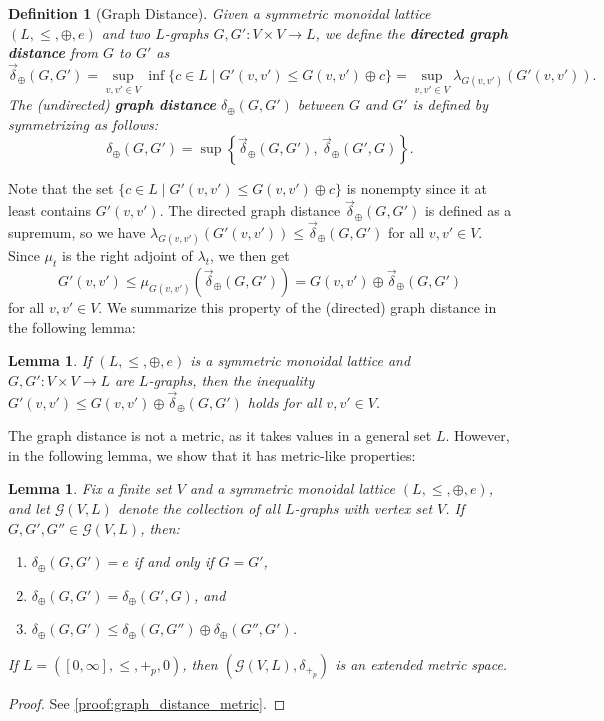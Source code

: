 \documentclass[a4paper,11pt]{article}
\newcommand{\atensor}{\oplus}
\newcounter{dummy}\numberwithin{dummy}{section}
\newtheorem{lemma}[dummy]{Lemma}
\newtheorem{definition}[dummy]{Definition}
\theoremstyle{remark}
\begin{document}
\begin{definition}[Graph Distance]
Given a symmetric monoidal lattice $(L,\leq,\atensor,e)$ and two $L$-graphs $G,G'\colon V\times V\to L$, we define the \textbf{directed graph distance} from $G$ to $G'$ as
\begin{equation*}
    \vec{\delta}_\atensor(G,G')=\sup_{v,v'\in V}\inf\{c\in L\mid G'(v,v')\leq G(v,v')\atensor c\}=\sup_{v,v'\in V}\lambda_{G(v,v')}\left(G'(v,v')\right).
\end{equation*}
The (undirected) \textbf{graph distance} $\delta_\atensor(G,G')$ between $G$ and $G'$ is defined by symmetrizing as follows:
\begin{equation*}
\delta_\atensor(G,G')=\sup\left\{\vec{\delta}_\atensor(G,G'),\,\vec{\delta}_\atensor(G',G)\right\}.
\end{equation*}
\end{definition}
Note that the set $\{c\in L\mid G'(v,v')\leq G(v,v')\atensor c\}$ is nonempty since it at least contains $G'(v,v')$. %
The directed graph distance $\vec{\delta}_\atensor(G,G')$ is defined as a supremum, so we have $\lambda_{G(v,v')}\left(G'(v,v')\right)\leq\vec{\delta}_\atensor(G,G')$ for all $v,v'\in V$. Since $\mu_t$ is the right adjoint of $\lambda_t$, we then get
\begin{equation*}
G'(v,v')\leq\mu_{G(v,v')}\left(\vec{\delta}_\atensor(G,G')\right)=G(v,v')\atensor\vec{\delta}_\atensor(G,G')
\end{equation*}
for all $v,v'\in V$. We summarize this property of the (directed) graph distance in the following lemma:
\begin{lemma}\label{lem:graph_distance_is_a_bound}
    If $(L,\leq,\atensor,e)$ is a symmetric monoidal lattice and $G,G'\colon V\times V\to L$ are $L$-graphs, then the inequality $G'(v,v')\leq G(v,v')\atensor\vec{\delta}_{\atensor}(G,G')$ holds for all $v,v'\in V$.
\end{lemma}

The graph distance is not a metric, as it takes values in a general set $L$. However, in the following lemma, we show that it has metric-like properties:
\begin{lemma}\label{lem:graph_distance_metric}
Fix a finite set $V$ and a symmetric monoidal lattice $(L,\leq,\atensor,e)$, and let $\mathcal{G}(V,L)$ denote the collection of all $L$-graphs with vertex set $V$. If $G,G',G''\in\mathcal{G}(V,L)$, then:
\begin{enumerate}
    \item $\delta_\atensor(G,G')=e$ if and only if $G=G'$,
    \item $\delta_\atensor(G,G')=\delta_\atensor(G',G)$, and
    \item $\delta_\atensor(G,G')\leq \delta_\atensor(G,G'')\atensor\delta_\atensor(G'',G')$.
\end{enumerate}
If $L=([0,\infty],\leq,+_p,0)$, then $(\mathcal{G}(V,L), \delta_{+_p})$ is an extended metric space.
\end{lemma}
\begin{proof}
See \cref{proof:graph_distance_metric}.
\end{proof}
\end{document}
